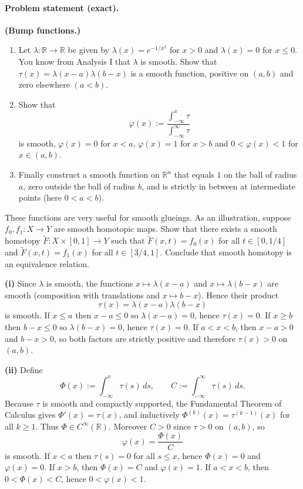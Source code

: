 \documentclass[12pt,a4paper]{article}
\theoremstyle{plain}
\theoremstyle{definition}      %
\begin{document}
\paragraph{Problem statement (exact).}
\textbf{(Bump functions.)}
\begin{enumerate}
	\item Let $\lambda : \mathbb{R} \to \mathbb{R}$ be given by $\lambda(x)=e^{-1/x^2}$ for $x>0$ and $\lambda(x)=0$ for $x\le 0$.
	You know from Analysis I that $\lambda$ is smooth. Show that $\tau(x)=\lambda(x-a)\lambda(b-x)$ is a smooth function, positive on $(a,b)$ and zero elsewhere $(a<b)$.
	\item Show that
	\[
	\varphi(x):=\frac{\int_{-\infty}^{x}\tau}{\int_{-\infty}^{\infty}\tau}
	\]
	is smooth, $\varphi(x)=0$ for $x<a$, $\varphi(x)=1$ for $x>b$ and $0<\varphi(x)<1$ for $x\in(a,b)$.
	\item Finally construct a smooth function on $\mathbb{R}^n$ that equals $1$ on the ball of radius $a$, zero outside the ball of radius $b$, and is strictly in between at intermediate points (here $0<a<b$).
\end{enumerate}
These functions are very useful for smooth glueings. As an illustration, suppose $f_0,f_1:X\to Y$ are smooth homotopic maps.
Show that there exists a smooth homotopy $\widetilde{F}:X\times[0,1]\to Y$ such that $\widetilde{F}(x,t)=f_0(x)$ for all $t\in[0,1/4]$
and $\widetilde{F}(x,t)=f_1(x)$ for all $t\in[3/4,1]$. Conclude that smooth homotopy is an equivalence relation.

\medskip
\noindent\textbf{(i)}
Since $\lambda$ is smooth, the functions $x\mapsto \lambda(x-a)$ and $x\mapsto \lambda(b-x)$ are smooth
(composition with translations and $x\mapsto b-x$). Hence their product
\[
\tau(x)=\lambda(x-a)\lambda(b-x)
\]
is smooth. If $x\le a$ then $x-a\le 0$ so $\lambda(x-a)=0$, hence $\tau(x)=0$. If $x\ge b$ then $b-x\le 0$ so $\lambda(b-x)=0$,
hence $\tau(x)=0$. If $a<x<b$, then $x-a>0$ and $b-x>0$, so both factors are strictly positive and therefore $\tau(x)>0$ on $(a,b)$.

\medskip
\noindent\textbf{(ii)}
Define
\[
\Phi(x):=\int_{-\infty}^{x}\tau(s)\,ds,\qquad C:=\int_{-\infty}^{\infty}\tau(s)\,ds.
\]
Because $\tau$ is smooth and compactly supported, the Fundamental Theorem of Calculus gives $\Phi'(x)=\tau(x)$, and inductively
$\Phi^{(k)}(x)=\tau^{(k-1)}(x)$ for all $k\ge 1$. Thus $\Phi\in C^\infty(\mathbb{R})$.
Moreover $C>0$ since $\tau>0$ on $(a,b)$, so
\[
\varphi(x)=\frac{\Phi(x)}{C}
\]
is smooth. If $x<a$ then $\tau(s)=0$ for all $s\le x$, hence $\Phi(x)=0$ and $\varphi(x)=0$. If $x>b$, then $\Phi(x)=C$ and
$\varphi(x)=1$. If $a<x<b$, then $0<\Phi(x)<C$, hence $0<\varphi(x)<1$.
\end{document}
